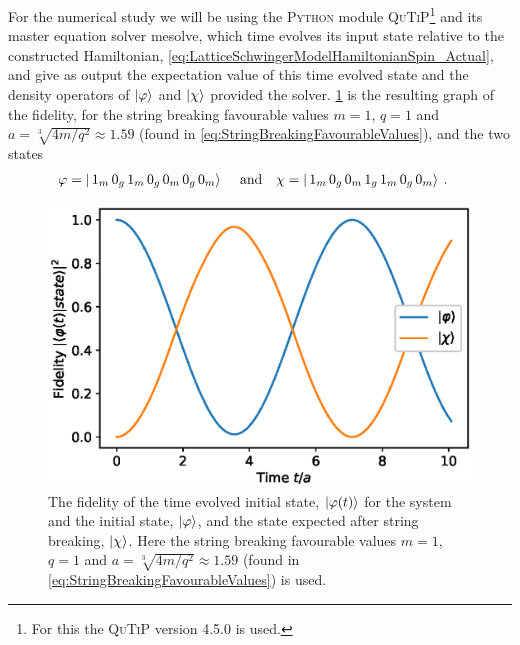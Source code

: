 \documentclass[../main.tex]{subfiles} %
\begin{document}
For the numerical study we will be using the \textsc{Python} module \textsc{QuTiP}\footnote{For this the \textsc{QuTiP} version 4.5.0 is used.} and its master equation solver \textsf{mesolve}, which time evolves its input state relative to the constructed Hamiltonian, \cref{eq:LatticeSchwingerModelHamiltonianSpin_Actual}, and give as output the expectation value of this time evolved state and the density operators of $\ket{\varphi}$ and $\ket{\chi}$ provided the solver. \cref{fig:stringBreakingNumerical} is the resulting graph of the fidelity, for the string breaking favourable values $m=1$, $q=1$ and $a = \sqrt[3\:\:]{4m/q^2} \approx \num{1.59}$ (found in \cref{eq:StringBreakingFavourableValues}), and the two states
\begin{align}
    \varphi &= \ket{\, 1_m\, 0_g\, 1_m\, 0_g\, 0_m\, 0_g\, 0_m} \: \quad \text{and} \quad \chi = \ket{\, 1_m\, 0_g\, 0_m\, 1_g\, 1_m\, 0_g\, 0_m} \: .
\end{align}

\begin{figure}[t]
    \centering
    \includegraphics[width=\textwidth]{text/images/stringBreakingNumerical.eps}
    \caption{The fidelity of the time evolved initial state, $\ket{\varphi(t)}$ for the system and the initial state, $\ket{\varphi}$, and the state expected after string breaking, $\ket{\chi}$. Here the string breaking favourable values $m=1$, $q=1$ and $a = \sqrt[3\:\:]{4m/q^2} \approx \num{1.59}$ (found in \cref{eq:StringBreakingFavourableValues}) is used.}
    \label{fig:stringBreakingNumerical}
\end{figure}
\end{document}

